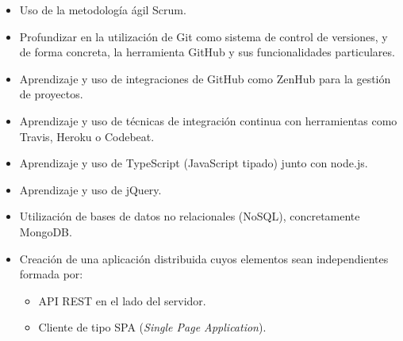\begin{itemize}
	\item Uso de la metodología ágil Scrum.
	\item Profundizar en la utilización de Git como sistema de control de versiones, y de forma concreta, la herramienta GitHub y sus funcionalidades particulares.
	\item Aprendizaje y uso de integraciones de GitHub como ZenHub para la gestión de proyectos.
	\item Aprendizaje y uso de técnicas de integración continua con herramientas como Travis, Heroku o Codebeat.
	\item Aprendizaje y uso de TypeScript (JavaScript tipado) junto con node.js.
	\item Aprendizaje y uso de jQuery.
	\item Utilización de bases de datos no relacionales (NoSQL), concretamente MongoDB.
	\item Creación de una aplicación distribuida cuyos elementos sean independientes formada por:
	
	\begin{itemize}
		\item API REST en el lado del servidor.
		\item Cliente de tipo SPA (\emph{Single Page Application}).
	\end{itemize}
\end{itemize}
